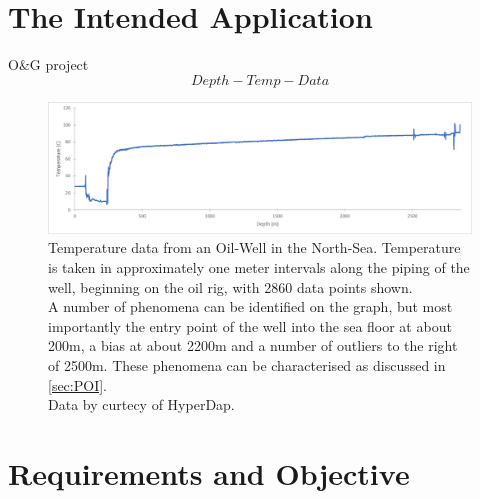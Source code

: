 \documentclass[main.tex]{subfiles}
\begin{document}
    
  \section{The Intended Application}
    
    
    O\&G project
    \[Depth-Temp-Data\]
    \begin{figure}[h]
      \centering
      \includegraphics[width=\linewidth]{figures/wellData}
      \caption{Temperature data from an Oil-Well in the North-Sea. Temperature is taken in approximately one meter intervals along the piping of the well, beginning on the oil rig, with 2860 data points shown. \\
      A number of phenomena can be identified on the graph, but most importantly the entry point of the well into the sea floor at about 200m, a bias at about 2200m and a number of outliers to the right of 2500m. These phenomena can be characterised as discussed in \cref{sec:POI}. \\
      Data by curtecy of HyperDap.}
      \label{fig:well}
    \end{figure}
  
  \section{Requirements and Objective}
    
\end{document}
